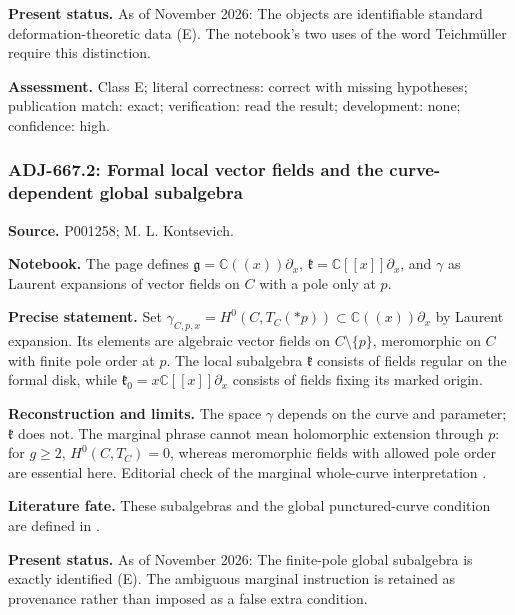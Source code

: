 \noindent\textbf{Present status.} As of November 2026: The objects are identifiable standard deformation-theoretic data (E). The notebook's two uses of the word Teichm\"uller require this distinction.\par

\noindent\textbf{Assessment.} Class E; literal correctness: correct with missing hypotheses; publication match: exact; verification: read the result; development: none; confidence: high.\par

\subsubsection{ADJ-667.2: Formal local vector fields and the curve-dependent global subalgebra}
\noindent\textbf{Source.} P001258; M. L. Kontsevich.\par
\noindent\textbf{Notebook.} The page defines \(\mathfrak g=\mathbb C((x))\partial_x\), \(\mathfrak k=\mathbb C[[x]]\partial_x\), and \(\gamma\) as Laurent expansions of vector fields on \(C\) with a pole only at \(p\).\par

\noindent\textbf{Precise statement.} Set \(\gamma_{C,p,x}=H^0(C,T_C(*p))\subset\mathbb C((x))\partial_x\) by Laurent expansion. Its elements are algebraic vector fields on \(C\setminus\{p\}\), meromorphic on \(C\) with finite pole order at \(p\). The local subalgebra \(\mathfrak k\) consists of fields regular on the formal disk, while \(\mathfrak k_0=x\mathbb C[[x]]\partial_x\) consists of fields fixing its marked origin.\par

\noindent\textbf{Reconstruction and limits.} The space \(\gamma\) depends on the curve and parameter; \(\mathfrak k\) does not. The marginal phrase  cannot mean holomorphic extension through \(p\): for \(g\ge2\), \(H^0(C,T_C)=0\), whereas meromorphic fields with allowed pole order are essential here. Editorial check of the marginal whole-curve interpretation \ours.\par

\noindent\textbf{Literature fate.} These subalgebras and the global punctured-curve condition are defined in \citet[\S1]{kontsevich1987virasoro}.\par

\noindent\textbf{Present status.} As of November 2026: The finite-pole global subalgebra is exactly identified (E). The ambiguous marginal instruction is retained as provenance rather than imposed as a false extra condition.\par

